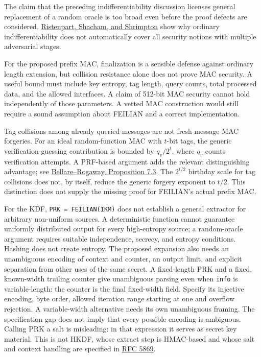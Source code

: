 \documentclass[
  english,
  11pt,
  a4paper,
]{article}
\begin{document}
The claim that the preceding indifferentiability discussion licenses
general replacement of a random oracle is too broad even before the
proof defects are considered.
\href{https://eprint.iacr.org/2011/339.pdf}{Ristenpart, Shacham, and
Shrimpton} show why ordinary indifferentiability does not automatically
cover all security notions with multiple adversarial stages.

For the proposed prefix MAC, finalization is a sensible defense against
ordinary length extension, but collision resistance alone does not prove
MAC security. A useful bound must include key entropy, tag length, query
counts, total processed data, and the allowed interfaces. A claim of
512-bit MAC security cannot hold independently of those parameters. A
vetted MAC construction would still require a sound assumption about
FEILIAN and a correct implementation.

Tag collisions among already queried messages are not fresh-message MAC
forgeries. For an ideal random-function MAC with \(t\)-bit tags, the
generic verification-guessing contribution is bounded by \(q_v/2^t\),
where \(q_v\) counts verification attempts. A PRF-based argument adds
the relevant distinguishing advantage; see
\href{https://www.cs.ucdavis.edu/~rogaway/classes/227/spring05/book/main.pdf\#page=167}{Bellare--Rogaway,
Proposition 7.3}. The \(2^{t/2}\) birthday scale for tag collisions does
not, by itself, reduce the generic forgery exponent to \(t/2\). This
distinction does not supply the missing proof for FEILIAN's actual
prefix MAC.

For the KDF, \texttt{PRK\ =\ FEILIAN(IKM)} does not establish a general
extractor for arbitrary non-uniform sources. A deterministic function
cannot guarantee uniformly distributed output for every high-entropy
source; a random-oracle argument requires suitable independence,
secrecy, and entropy conditions. Hashing does not create entropy. The
proposed expansion also needs an unambiguous encoding of context and
counter, an output limit, and explicit separation from other uses of the
same secret. A fixed-length PRK and a fixed, known-width trailing
counter give unambiguous parsing even when \texttt{info} is
variable-length: the counter is the final fixed-width field. Specify its
injective encoding, byte order, allowed iteration range starting at one
and overflow rejection. A variable-width alternative needs its own
unambiguous framing. The specification gap does not imply that every
possible encoding is ambiguous. Calling PRK a salt is misleading: in
that expression it serves as secret key material. This is not HKDF,
whose extract step is HMAC-based and whose salt and context handling are
specified in \href{https://www.rfc-editor.org/rfc/rfc5869.html}{RFC
5869}.
\end{document}
